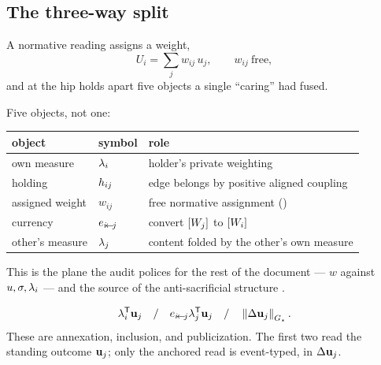 \documentclass[../main]{subfiles}
\begin{document}
\subsection{The three-way split}
\label{subsec:hip:split}
%
A normative reading assigns a weight,
\begin{equation}
  U_i=\sum_j w_{ij}\,u_j,\qquad w_{ij}\ \text{free},
  \label{nrm:assign}
\end{equation}
and  at the hip holds apart five objects a single ``caring'' had fused.

\begin{theorem}
  Five objects, not one:
  \par\medskip
  \begin{tabularx}{\textwidth}{@{} l l L @{}}
    \toprule
    \textbf{object} & \textbf{symbol} & \textbf{role} \\
    \midrule
    own measure & $\lambda\sb{i}$ & holder's private weighting \\
    holding & $h\sb{ ij }$ & edge belongs by positive aligned coupling \\
    assigned weight & $w_{ij}$ & free normative assignment () \\
    currency & $e\sb{ \ensuremath{i\!\leftarrow\!j} }$ & convert $[W\sb{j}]$ to $[W\sb{i}]$ \\
    other's measure & $\lambda\sb{j}$ & content folded by the other's own measure \\
    \bottomrule
  \end{tabularx}
  \par\medskip
\end{theorem}

This is the plane the audit polices for the rest of the document --- $w$ against
$u,\sigma,\lambda\sb{i}$ --- and the source of the anti-sacrificial structure
.

\begin{definition}
  \begin{equation}
    \lambda\sb{i}\sp{\mathsf{T}}\mathbf{u}\sb{j}
    \quad/\quad
    e\sb{ \ensuremath{i\!\leftarrow\!j} }\lambda\sb{j}\sp{\mathsf{T}}\mathbf{u}\sb{j}
    \quad/\quad
    \left\lVert \Delta\mathbf{u}\sb{j} \right\rVert\sb{ \ensuremath{G\sb{\star}} }.
    \label{eq:nrm:public}
  \end{equation}
  These are annexation, inclusion, and publicization. The first two read the standing
  outcome $\mathbf{u}\sb{j}$; only the anchored read is event-typed, in $\Delta\mathbf{u}\sb{j}$.
\end{definition}
\end{document}
